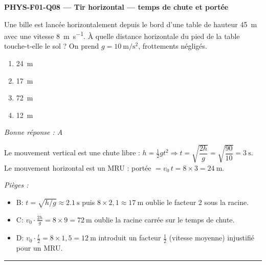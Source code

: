 \documentclass[11pt,a4paper]{article}
\newcommand{\vv}[1]{\vec{#1}}\newcommand{\ds}{\displaystyle}
\begin{document}
\noindent\textbf{PHYS-F01-Q08 --- Tir horizontal --- temps de chute et portée}\par
Une bille est lancée horizontalement depuis le bord d'une table de hauteur \qty{45}{\metre} avec une vitesse \qty{8}{\metre\per\second}. À quelle distance horizontale du pied de la table touche-t-elle le sol ? On prend $g=\qty{10}{\metre\per\second\squared}$, frottements négligés.
\begin{center}
\end{center}
\begin{enumerate}[label=\Alph*)]
\item \qty{24}{\metre}
\item \qty{17}{\metre}
\item \qty{72}{\metre}
\item \qty{12}{\metre}
\end{enumerate}
\textit{Bonne réponse : A}\par
Le mouvement vertical est une chute libre : $h=\frac12 g t^2\Rightarrow t=\sqrt{\dfrac{2h}{g}}=\sqrt{\dfrac{90}{10}}=\qty{3}{\second}$. Le mouvement horizontal est un MRU : portée $=v_0\,t=8\times 3=\qty{24}{\metre}$.\par
\textit{Pièges :}
\begin{itemize}
\item B: $t=\sqrt{h/g}\approx\qty{2.1}{\second}$ puis $8\times 2{,}1\approx\qty{17}{\metre}$ oublie le facteur 2 sous la racine.
\item C: $v_0\cdot\frac{2h}{g}=8\times 9=\qty{72}{\metre}$ oublie la racine carrée sur le temps de chute.
\item D: $v_0\cdot\frac{t}{2}=8\times 1{,}5=\qty{12}{\metre}$ introduit un facteur $\frac12$ (vitesse moyenne) injustifié pour un MRU.
\end{itemize}
\vspace{8pt}\hrule\vspace{8pt}
\end{document}
